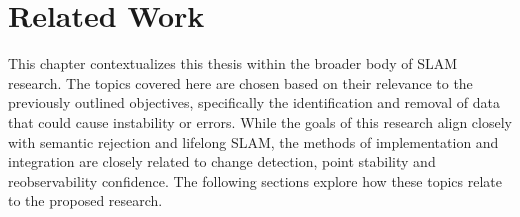\section{Related Work}
\label{sec:related_work}

This chapter contextualizes this thesis within the broader body of SLAM research. The topics covered here are chosen based on their relevance to the previously outlined objectives, specifically the identification and removal of data that could cause instability or errors. While the goals of this research align closely with semantic rejection and lifelong SLAM, the methods of implementation and integration are closely related to change detection, point stability and reobservability confidence. The following sections explore how these topics relate to the proposed research.

% 